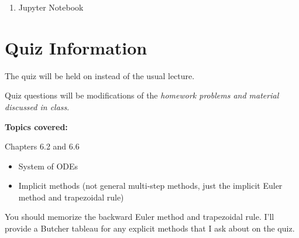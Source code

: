 \documentclass[reqno]{exam}
\begin{document}
\begin{enumerate}

  \item Jupyter Notebook

\end{enumerate}

\newpage
\section*{Quiz Information}

The quiz will be held on  instead of the usual lecture.

Quiz questions will be modifications of the {\it homework problems and material discussed in class}.

\textbf{Topics covered:}

Chapters 6.2 and 6.6

\begin{itemize}
  \item System of ODEs
  \item Implicit methods (not general multi-step methods, just the implicit Euler method and trapezoidal rule)
\end{itemize}

You should memorize the backward Euler method and trapezoidal rule. I'll provide a Butcher tableau for any explicit methods that I ask about on the quiz.
\end{document}
